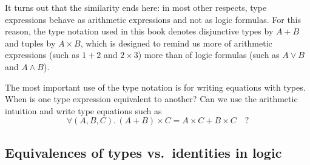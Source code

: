It turns out that the similarity ends here: in most other respects,
type expressions behave as arithmetic expressions and not as logic
formulas. For this reason, the type notation used in this book denotes
disjunctive types by $A+B$ and tuples by $A\times B$, which is designed
to remind us more of arithmetic expressions (such as $1+2$ and $2\times3$)
more than of logic formulas (such as $A\vee B$ and $A\wedge B$). 

The most important use of the type notation is for writing equations
with types. When is one type expression equivalent to another? Can
we use the arithmetic intuition and write type equations such as 
\begin{equation}
\forall(A,B,C).\,\left(A+B\right)\times C=A\times C+B\times C\quad?\label{eq:ch-example-distributive}
\end{equation}


\subsection{Equivalences of types vs.~identities in logic}

